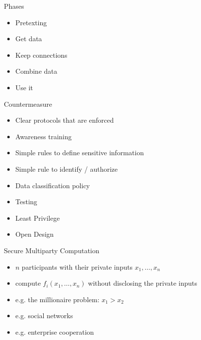 \documentclass{beamer}
\begin{document}
\begin{frame}{Phases}
  \begin{itemize}
    \item Pretexting
    \item Get data
    \item Keep connections
    \item Combine data
    \item Use it
  \end{itemize}
\end{frame}

\begin{frame}{Countermeasure}
  \begin{itemize}
    \item Clear protocols that are enforced
    \item Awareness training
    \item Simple rules to define sensitive information
    \item Simple rule to identify / authorize
    \item Data classification policy
    \item Testing
    \item Least Privilege
    \item Open Design
  \end{itemize}
\end{frame}

\begin{frame}{Secure Multiparty Computation}
  \begin{itemize}
    \item $n$ participants with their private inputs
      $x_1,\dots,x_n$
    \item compute $f_i(x_1,\dots,x_n)$ without disclosing the private
      inputs
    \item e.g. the millionaire problem:
      $x_1 > x_2$
    \item e.g. social networks
    \item e.g. enterprise cooperation
  \end{itemize}
\end{frame}
\end{document}
